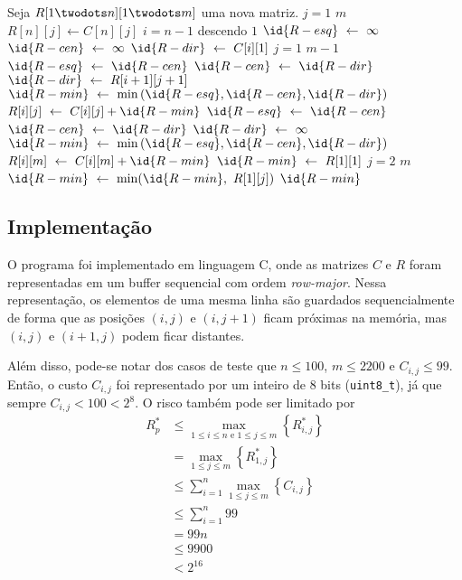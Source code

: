 \begin{minipage}[t]{0.47\textwidth}
    \begin{codebox}
        \li Seja $R[1 \twodots n][1 \twodots m]$ uma nova matriz.
        \li
        \li {} $j = 1$  $m$
            \Do
        \li     $R[n][j] \gets C[n][j]$
            \End
        \li
        \li {} $i = n - 1$ descendo  $1$
            \Do
        \li     $\id{R-esq} \gets \infty$
        \li     $\id{R-cen} \gets \infty$
        \li     $\id{R-dir} \gets C[i][1]$
        \li
        \li     {} $j = 1$  $m - 1$
                \Do
        \li         $\id{R-esq} \gets \id{R-cen}$
        \li         $\id{R-cen} \gets \id{R-dir}$
        \li         $\id{R-dir} \gets R[i+1][j+1]$
        \li
        \li         $\id{R-min} \gets \min\left(\id{R-esq}, \id{R-cen}, \id{R-dir}\right)$
        \li         $R[i][j] \gets C[i][j] + \id{R-min}$
                \End
        \li
        \li     $\id{R-esq} \gets \id{R-cen}$
        \li     $\id{R-cen} \gets \id{R-dir}$
        \li     $\id{R-dir} \gets \infty$
        \li
        \li     $\id{R-min} \gets \min\left(\id{R-esq}, \id{R-cen}, \id{R-dir}\right)$
        \li     $R[i][m] \gets C[i][m] + \id{R-min}$
            \End
        \li
        \li $\id{R-min} \gets R[1][1]$
        \li {} $j = 2$  $m$
            \Do
        \li     $\id{R-min} \gets \min(\id{R-min},~R[1][j])$
            \End
        \li {} $\id{R-min}$
    \end{codebox}
\end{minipage}

\subsection{Implementação}

O programa foi implementado em linguagem C, onde as matrizes $C$ e $R$ foram representadas em um buffer sequencial com ordem \textit{row-major}. Nessa representação, os elementos de uma mesma linha são guardados sequencialmente de forma que as posições $(i, j)$ e $(i, j + 1)$ ficam próximas na memória, mas $(i, j)$ e $(i + 1, j)$ podem ficar distantes.

Além disso, pode-se notar dos casos de teste que $n \leq 100$, $m \leq 2200$ e $C_{i, j} \leq 99$. Então, o custo $C_{i, j}$ foi representado por um inteiro de 8 bits (\texttt{uint8\_t}), já que sempre $C_{i, j} < 100 < 2^8$. O risco também pode ser limitado por
\begin{align*}
    R^*_p &\leq \max_{1 \leq i \leq n \text{~e~} 1 \leq j \leq m} \left\{R^*_{i, j}\right\} \\
        &= \max_{1 \leq j \leq m} \left\{R^*_{1, j}\right\} \\
        &\leq \sum_{i = 1}^n \max_{1 \leq j \leq m}\left\{C_{i, j}\right\} \\
        &\leq \sum_{i = 1}^n 99 \\
        &= 99 n \\
        &\leq 9900 \\
        &< 2^{16}
\end{align*}

